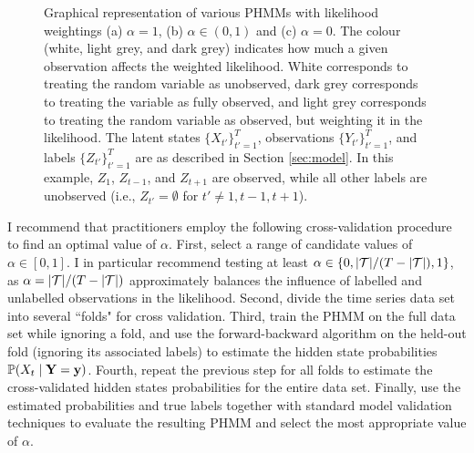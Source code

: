 \begin{figure}
    \caption{Graphical representation of various PHMMs with likelihood weightings (a) $\alpha = 1$, (b) $\alpha \in (0,1)$ and (c) $\alpha = 0$. The colour (white, light grey, and dark grey) indicates how much a given observation affects the weighted likelihood. White corresponds to treating the random variable as unobserved, dark grey corresponds to treating the variable as fully observed, and light grey corresponds to treating the random variable as observed, but weighting it in the likelihood. The latent states $\{X_{t'}\}_{t'=1}^{T}$, observations $\{Y_{t'}\}_{t'=1}^{T}$, and labels $\{Z_{t'}\}_{t'=1}^{T}$ are as described in Section \ref{sec:model}. %
    In this example, $Z_1$, $Z_{t-1}$, and $Z_{t+1}$ are observed, while all other labels are unobserved (i.e., $Z_{t'} = \emptyset$ for $t' \neq 1,t-1,t+1$).}
    \label{fig:PHMM}
\end{figure}

I recommend that practitioners employ the following cross-validation procedure to find an optimal value of $\alpha$. First, select a range of candidate values of $\alpha \in [0,1]$. I in particular recommend testing at least $\alpha \in \{0,|\mathcal{T}| / (T - |\mathcal{T}|), 1\}$, as $\alpha = |\mathcal{T}| / (T - |\mathcal{T}|)$ approximately balances the influence of labelled and unlabelled observations in the likelihood. Second, divide the time series data set into several ``folds" for cross validation. Third, train the PHMM on the full data set while ignoring a fold, and use the forward-backward algorithm on the held-out fold (ignoring its associated labels) to estimate the hidden state probabilities $\mathbb{P}(X_t \mid \mathbf{Y} = \mathbf{y})$. Fourth, repeat the previous step for all folds to estimate the cross-validated hidden states probabilities for the entire data set. Finally, use the estimated probabilities and true labels together with standard model validation techniques to evaluate the resulting PHMM and select the most appropriate value of $\alpha$. %
